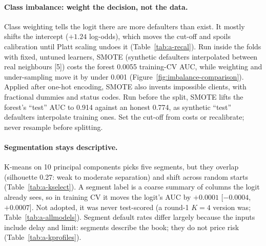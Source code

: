 \paragraph{Class imbalance: weight the decision, not the data.}
Class weighting tells the logit there are more defaulters than exist. It mostly shifts the intercept ($+1.24$ log-odds), which moves the cut-off and spoils calibration until Platt scaling undoes it (Table~\ref{tab:a-recal}). Run inside the folds with fixed, untuned learners, SMOTE (synthetic defaulters interpolated between real neighbours [5]) costs the forest 0.0055 training-CV AUC, while weighting and under-sampling move it by under 0.001 (Figure~\ref{fig:imbalance-comparison}). Applied after one-hot encoding, SMOTE also invents impossible clients, with fractional dummies and status codes. Run before the split, SMOTE lifts the forest's ``test'' AUC to 0.914 against an honest 0.774, as synthetic ``test'' defaulters interpolate training ones. Set the cut-off from costs or recalibrate; never resample before splitting.

\paragraph{Segmentation stays descriptive.}
K-means on 10 principal components picks five segments, but they overlap (silhouette 0.27: weak to moderate separation) and shift across random starts (Table~\ref{tab:a-kselect}). A segment label is a coarse summary of columns the logit already sees, so in training CV it moves the logit's AUC by $+0.0001$ [$-0.0004$, $+0.0007$]. Not adopted, it was never test-scored (a round-1 $K = 4$ version was; Table~\ref{tab:a-allmodels}). Segment default rates differ largely because the inputs include delay and limit: segments describe the book; they do not price risk (Table~\ref{tab:a-kprofiles}).
